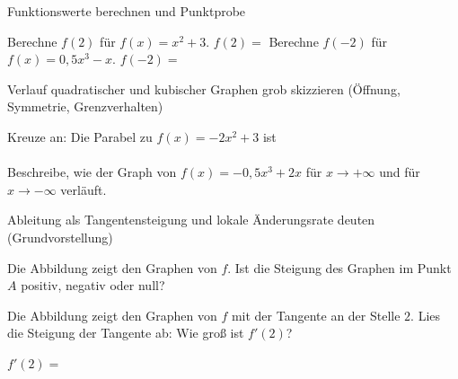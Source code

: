 \begin{aufgabe}{Funktionswerte berechnen und Punktprobe}
\begin{teile}
\teil Berechne $f(2)$ für $f(x) = x^2 + 3$. $f(2) = $ \leerfeld
\teil Berechne $f(-2)$ für $f(x) = 0{,}5x^3 - x$. $f(-2) = $ \leerfeld
\end{teile}
\end{aufgabe}

\begin{aufgabe}{Verlauf quadratischer und kubischer Graphen grob skizzieren (Öffnung, Symmetrie, Grenzverhalten)}
\begin{teile}
\teil Kreuze an: Die Parabel zu $f(x) = -2x^2 + 3$ ist \\  \\ 
\teil Beschreibe, wie der Graph von $f(x) = -0{,}5x^3 + 2x$ für $x \to +\infty$ und für $x \to -\infty$ verläuft.
\end{teile}
\end{aufgabe}

\begin{aufgabe}{Ableitung als Tangentensteigung und lokale Änderungsrate deuten (Grundvorstellung)}
\begin{teile}
\teil Die Abbildung zeigt den Graphen von $f$. Ist die Steigung des Graphen im Punkt $A$ positiv, negativ oder null? \\   

\begin{ksys}[xmin=-3,xmax=4,ymin=-2,ymax=4,ablesen]    \end{ksys}
\teil Die Abbildung zeigt den Graphen von $f$ mit der Tangente an der Stelle $2$. Lies die Steigung der Tangente ab: Wie groß ist $f'(2)$?

\begin{ksys}[xmin=-1,xmax=4,ymin=-1,ymax=5,ablesen]   \end{ksys}
$f'(2) = $ \leerfeld
\end{teile}
\end{aufgabe}

